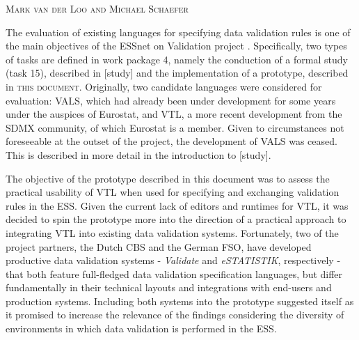 \textsc{Mark van der Loo and Michael Schaefer}
\vspace{0.6 cm}

The evaluation of existing languages for specifying data validation rules is
one of the main objectives of the ESSnet on Validation project \citep{ESS:2015}. Specifically, two types of tasks are defined in work package 4,
namely the conduction of a formal study (task 15), described in [study] and the
implementation of a prototype, described in \textsc{this document}. Originally,
two candidate languages were considered for evaluation: VALS, which had already
been under development for some years under the auspices of Eurostat, and VTL,
a more recent development from the SDMX community, of which Eurostat is a
member. Given to circumstances not foreseeable at the outset of the project, the
development of VALS was ceased. This is described in more detail in the
introduction to [study].

The objective of the prototype described in this document was to assess the
practical usability of VTL when used for specifying and exchanging validation
rules in the ESS. Given the current lack of editors and runtimes for VTL, it
was decided to spin the prototype more into the direction of a practical
approach to integrating VTL into existing data validation systems. Fortunately,
two of the project partners, the Dutch CBS and the German FSO, have developed
productive data validation systems -  \textit{Validate} and
\textit{eSTATISTIK}, respectively - that both feature full-fledged data
validation specification languages, but differ fundamentally in their technical
layouts and integrations with end-users and production systems. Including both
systems into the prototype suggested itself as it promised to increase the
relevance of the findings considering the diversity of environments in which
data validation is performed in the ESS.
